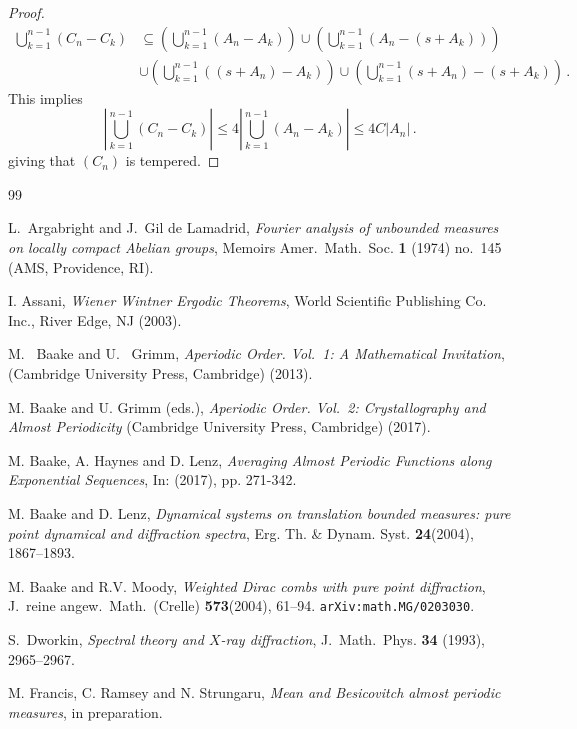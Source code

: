 \documentclass [14pt]{amsart}
\numberwithin{equation}{section}
\begin{document}
\begin{appendix}
\begin{proof}
\begin{align*}
  \bigcup_{k=1}^{n-1} (C_n-C_k) 	& \subseteq \left( \bigcup_{k=1}^{n-1} (A_n-A_k) \right) \cup \left( \bigcup_{k=1}^{n-1} (A_n-(s+A_k)) \right) \\
& \cup \left( \bigcup_{k=1}^{n-1} ((s+A_n)-A_k) \right) \cup \left( \bigcup_{k=1}^{n-1} (s+A_n)-(s+A_k) \right) \,.
\end{align*}
This implies
\[
\left|    \bigcup_{k=1}^{n-1} (C_n-C_k)  \right| \leq 4 \left|    \bigcup_{k=1}^{n-1} (A_n-A_k)  \right|  \leq 4C |A_n| \,.
\]
giving that $(C_n)$ is tempered.
\end{proof}

\end{appendix}




\begin{thebibliography}{99}

L.~Argabright and J.~Gil de Lamadrid, \textit{Fourier analysis of
unbounded measures on locally compact Abelian groups}, {Memoirs
Amer.\ Math.\ Soc.} \textbf{1} (1974) no.\ 145 (AMS, Providence,
RI).

 I. Assani, \textit{Wiener Wintner Ergodic Theorems}, World Scientific Publishing Co. Inc., River Edge, NJ (2003).


M. ~Baake and U.~ Grimm, \textit{Aperiodic Order. Vol.~1: A Mathematical Invitation},
(Cambridge University Press, Cambridge) (2013).

M. Baake and U. Grimm (eds.), \textit{Aperiodic Order. Vol.~2: Crystallography and Almost Periodicity}
(Cambridge University Press, Cambridge) (2017).

M. Baake, A. Haynes and D. Lenz, \textit{Averaging Almost Periodic Functions along
Exponential Sequences}, In:  \cite{TAO2} (2017),  pp. 271-342.

M. Baake and D. Lenz, \textit{Dynamical systems on translation bounded measures: pure point dynamical and diffraction spectra},
Erg. Th. \& Dynam. Syst. \textbf{24}(2004), 1867--1893.

M. Baake and R.V. Moody, \textit{Weighted Dirac combs with pure point diffraction},
J.\ reine angew.\ Math.\ (Crelle) \textbf{573}(2004), 61--94.
\texttt{arXiv:math.MG/0203030}.

 S.~Dworkin, \textit{Spectral theory and $X$-ray diffraction},  {J.\
Math.\ Phys.} \textbf{ 34} (1993), 2965--2967.

M. Francis, C. Ramsey and N. Strungaru,
\textit{Mean and Besicovitch almost periodic measures}, in preparation.


\end{thebibliography}
\end{document}
